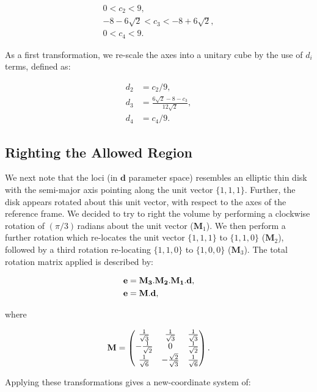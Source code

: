 \begin{align}
0 < c_2 < 9,\nonumber\\
-8-6\sqrt{2} < c_3 < -8+6\sqrt{2},\nonumber\\
0 < c_4 < 9.
\end{align}

As a first transformation, we re-scale the axes into a unitary cube by the use 
of $d_i$ terms, defined as:

\begin{align}
d_2 &= c_2/9, \nonumber\\
d_3 &= \frac{6\sqrt{2} - 8 - c_3}{12\sqrt{2}}, \nonumber\\
d_4 &= c_4/9.
\end{align}

\subsection{Righting the Allowed Region}

We next note that the loci (in $\mathbf{d}$ parameter space) resembles an
elliptic thin disk with the semi-major axis pointing along the unit vector 
$\{1,1,1\}$. Further, the disk appears rotated about this unit vector, with
respect to the axes of the reference frame. We decided to try to right the 
volume by performing a clockwise rotation of $(\pi/3)$\,radians about the unit 
vector ($\mathbf{M}_1$). We then perform a further rotation which re-locates the 
unit vector $\{1,1,1\}$ to $\{1,1,0\}$ ($\mathbf{M}_2$), followed by a third 
rotation re-locating $\{1,1,0\}$ to $\{1,0,0\}$ ($\mathbf{M}_3$). The total 
rotation matrix applied is described by:

\begin{align}
{\bf e} &= {\bf M_3}.{\bf M_2}.{\bf M_1}.{\bf d},\nonumber\\
{\bf e} &= {\bf M}.{\bf d},
\end{align}

where

\begin{eqnarray}
{\bf M} =\left(\begin{matrix}
\frac{1}{\sqrt{3}} & \frac{1}{\sqrt{3}} & \frac{1}{\sqrt{3}} \cr
-\frac{1}{\sqrt{2}} & 0 & \frac{1}{\sqrt{2}} \cr
\frac{1}{\sqrt{6}} & -\frac{\sqrt{2}}{\sqrt{3}} & \frac{1}{\sqrt{6}} \cr \end{matrix}\right).
\label{eqn:Mrot}
\end{eqnarray}

Applying these transformations gives a new-coordinate system of:

